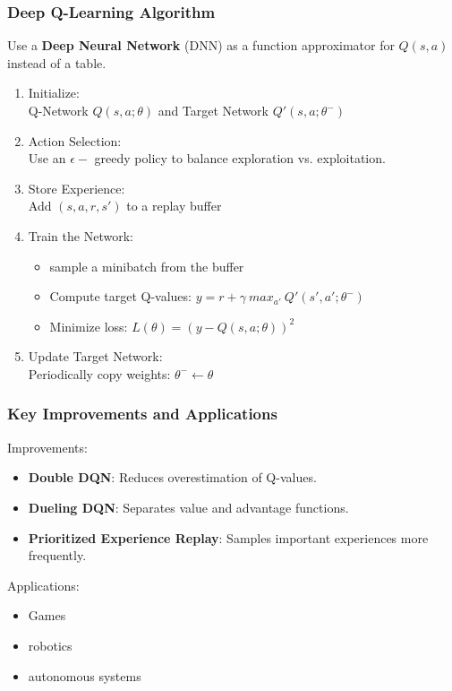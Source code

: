 \begin{frame}
	\frametitle{Deep Q-Learning Algorithm }
	\vspace{0.2cm}
	Use a \textbf{Deep Neural Network} (DNN) as a function approximator for $Q(s,a)$ instead of a table.
		\begin{enumerate}		
			\pause
			\item Initialize: \\ Q-Network $Q(s,a;\theta)$ and Target Network $Q'(s,a;\theta^{-})$
			\pause
			\item Action Selection: \\ Use an $\epsilon-$ greedy policy to balance exploration vs. exploitation.
			\pause
			\item Store Experience: \\ Add $(s,a,r,s')$ to a replay buffer
			\pause
			\item Train the Network: \\ 
				\begin{itemize} 
					 \item sample a minibatch from the buffer
					 \item Compute target Q-values: $y = r + \gamma \ max_{a'} \ Q'(s',a';\theta^{-})$
					\item Minimize loss: $L(\theta)=(y-Q(s,a;\theta))^2$
				\end{itemize}
			\pause
			\item Update Target Network: \\ Periodically copy weights: $\theta^{-} \leftarrow \theta$

		\end{enumerate}
\end{frame}

\begin{frame}
	\frametitle{Key Improvements and Applications}
	\vspace{0.5cm}
	Improvements:
		\begin{itemize}		
			\item \textbf{Double DQN}: Reduces overestimation of Q-values.
			\item\textbf{Dueling DQN}: Separates value and advantage functions.
			\item \textbf{Prioritized Experience Replay}: Samples important experiences more frequently.
		\end{itemize}
	\pause
	Applications:
		\begin{itemize}
			\item Games
			\item robotics
			\item autonomous systems
		\end{itemize}
\end{frame}


